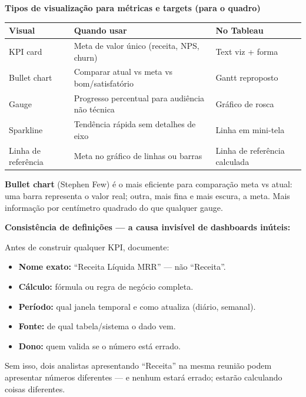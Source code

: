 \begin{BoardBox}
\textbf{Tipos de visualização para métricas e targets (para o quadro)}

\begin{tabular}{|l|p{6.5cm}|p{4cm}|}
\hline
\textbf{Visual} & \textbf{Quando usar} & \textbf{No Tableau} \\
\hline
KPI card & Meta de valor único (receita, NPS, churn) & Text viz + forma \\
Bullet chart & Comparar atual vs meta vs bom/satisfatório & Gantt reproposto \\
Gauge & Progresso percentual para audiência não técnica & Gráfico de rosca \\
Sparkline & Tendência rápida sem detalhes de eixo & Linha em mini-tela \\
Linha de referência & Meta no gráfico de linhas ou barras & Linha de referência calculada \\
\hline
\end{tabular}

\textbf{Bullet chart} (Stephen Few) é o mais eficiente para comparação meta vs atual:
uma barra representa o valor real; outra, mais fina e mais escura, a meta.
Mais informação por centímetro quadrado do que qualquer gauge.
\end{BoardBox}

\begin{SolvedBox}
\textbf{Consistência de definições — a causa invisível de dashboards inúteis:}

Antes de construir qualquer KPI, documente:
\begin{itemize}
  \item \textbf{Nome exato:} ``Receita Líquida MRR'' — não ``Receita''.
  \item \textbf{Cálculo:} fórmula ou regra de negócio completa.
  \item \textbf{Período:} qual janela temporal e como atualiza (diário, semanal).
  \item \textbf{Fonte:} de qual tabela/sistema o dado vem.
  \item \textbf{Dono:} quem valida se o número está errado.
\end{itemize}

Sem isso, dois analistas apresentando ``Receita'' na mesma reunião podem
apresentar números diferentes — e nenhum estará errado; estarão calculando
coisas diferentes.
\end{SolvedBox}

